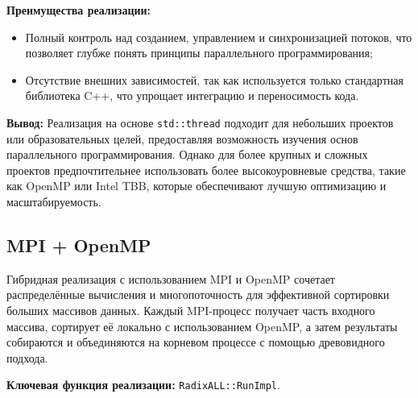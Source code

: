 \documentclass[12pt]{article}
\begin{document}
\textbf{Преимущества реализации:}
\begin{itemize}
  \item Полный контроль над созданием, управлением и синхронизацией потоков, что позволяет глубже понять принципы параллельного программирования;
  \item Отсутствие внешних зависимостей, так как используется только стандартная библиотека C++, что упрощает интеграцию и переносимость кода.
\end{itemize}

\textbf{Вывод:} Реализация на основе \texttt{std::thread} подходит для небольших проектов или образовательных целей, предоставляя возможность изучения основ параллельного программирования. Однако для более крупных и сложных проектов предпочтительнее использовать более высокоуровневые средства, такие как OpenMP или Intel TBB, которые обеспечивают лучшую оптимизацию и масштабируемость.


\subsection{MPI + OpenMP}

Гибридная реализация с использованием MPI и OpenMP сочетает распределённые вычисления и многопоточность для эффективной сортировки больших массивов данных. Каждый MPI-процесс получает часть входного массива, сортирует её локально с использованием OpenMP, а затем результаты собираются и объединяются на корневом процессе с помощью древовидного подхода.

\textbf{Ключевая функция реализации:} \texttt{RadixALL::RunImpl}.
\end{document}
